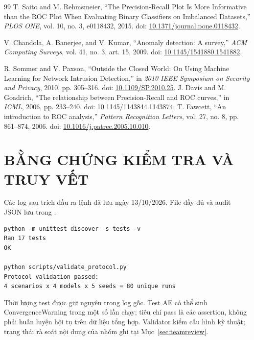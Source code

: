 \documentclass[12pt,a4paper,oneside]{report}
\begin{document}
\begin{thebibliography}{99}
T. Saito and M. Rehmsmeier, ``The Precision-Recall Plot Is More Informative than the ROC Plot When Evaluating Binary Classifiers on Imbalanced Datasets,'' \textit{PLOS ONE}, vol. 10, no. 3, e0118432, 2015. doi: \href{https://doi.org/10.1371/journal.pone.0118432}{10.1371/journal.pone.0118432}.

V. Chandola, A. Banerjee, and V. Kumar, ``Anomaly detection: A survey,'' \textit{ACM Computing Surveys}, vol. 41, no. 3, art. 15, 2009. doi: \href{https://doi.org/10.1145/1541880.1541882}{10.1145/1541880.1541882}.


 R. Sommer and V. Paxson, ``Outside the Closed World: On Using Machine Learning for Network Intrusion Detection,'' in \textit{2010 IEEE Symposium on Security and Privacy}, 2010, pp. 305--316. doi: \href{https://doi.org/10.1109/SP.2010.25}{10.1109/SP.2010.25}.
 J. Davis and M. Goadrich, ``The relationship between Precision-Recall and ROC curves,'' in \textit{ICML}, 2006, pp. 233--240. doi: \href{https://doi.org/10.1145/1143844.1143874}{10.1145/1143844.1143874}.
 T. Fawcett, ``An introduction to ROC analysis,'' \textit{Pattern Recognition Letters}, vol. 27, no. 8, pp. 861--874, 2006. doi: \href{https://doi.org/10.1016/j.patrec.2005.10.010}{10.1016/j.patrec.2005.10.010}.
\end{thebibliography}\endgroup


\appendix
{}
\chapter{BẰNG CHỨNG KIỂM TRA VÀ TRUY VẾT}\label{app:evidence}
Các log sau trích đầu ra lệnh đã lưu ngày 13/10/2026. File đầy đủ và audit JSON lưu trong .
\begingroup\small
\begin{verbatim}
python -m unittest discover -s tests -v
Ran 17 tests
OK

python scripts/validate_protocol.py
Protocol validation passed:
4 scenarios x 4 models x 5 seeds = 80 unique runs
\end{verbatim}\endgroup
Thời lượng test được giữ nguyên trong log gốc. Test AE có thể sinh ConvergenceWarning trong một số lần chạy; tiêu chí pass là các assertion, không phải huấn luyện hội tụ trên dữ liệu tổng hợp. Validator kiểm cấu hình kỹ thuật; trạng thái rà soát nội dung của nhóm ghi tại Mục~\ref{sec:teamreview}.
\end{document}
